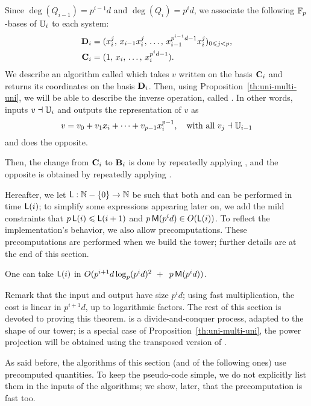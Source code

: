 Since $\deg(Q_{i-1})=p^{i-1}d$ and $\deg(Q_{i})=p^id$, we associate
the following $\mathbb{F}_p$-bases of $\mathbb{U}_i$ to each system:
\begin{align}
  \mathbf{D}_i &= (x_i^j,\,x_{i-1}x_i^j,\,\ldots,\,x_{i-1}^{p^{i-1}d-1}x_i^j)_{0 \leqslant j < p}\text{,}\\
  \label{eq:bases}
  \mathbf{C}_i &= (1,\,x_i,\,\ldots,\,x_i^{p^id-1})\text{.}  
\end{align}
We describe an algorithm called  which takes $v$
written on the basis $\mathbf{C}_i$ and returns its coordinates on the
basis $\mathbf{D}_i$. Then, using Proposition~\ref{th:uni-multi-uni},
we will be able to describe the inverse operation, called
.  In other words,  inputs $v\dashv\mathbb{U}_i$ and
outputs the representation of $v$ as
\begin{equation}
  \label{eq:vectorspace}
  v = v_0 + v_1x_i + \cdots + v_{p-1}x_i^{p-1}, \quad\text{with all~} v_j \dashv \mathbb{U}_{i-1}
\end{equation}
and  does the opposite.

Then, the change from $\mathbf{C}_i$ to $\mathbf{B}_i$ is done by
repeatedly applying , and the opposite is obtained by
repeatedly applying .

Hereafter, we let $\mathsf{L}:\mathbb{N}-\{0\} \to \mathbb{N}$ be such that both
 and  can be performed in time $\mathsf{L}(i)$; to
simplify some expressions appearing later on, we add the mild
constraints that $p\,\mathsf{L}(i) \leqslant \mathsf{L}(i+1)$ and $p\,\mathsf{M}(p^{i}d)
\in O(\mathsf{L}(i))$.
To reflect the implementation's behavior, we also allow
precomputations. These precomputations are performed when we build
the tower; further details are at the end of this section.
\begin{theorem}\label{theo:L}
  One can take $\mathsf{L}(i)$ in $O( p^{i+1}d\log_p(p^id)^2 \ + \
\,p\,\mathsf{M}(p^{i}d))$.
\end{theorem}
Remark that the input and output have size $p^id$; using fast
multiplication, the cost is linear in $p^{i+1}d$, up to logarithmic
factors. The rest of this section is devoted to proving this theorem.
\alg{Push-down} is a divide-and-conquer process, adapted to the shape
of our tower; \alg{Lift-up} is a special case of
Proposition~\ref{th:uni-multi-uni}, the power projection will be
obtained using the transposed version of \alg{Push-down}.

As said before, the algorithms of this section (and of the following
ones) use precomputed quantities. To keep the pseudo-code simple, we
do not explicitly list them in the inputs of the algorithms;
we show, later, that the precomputation is fast too.

